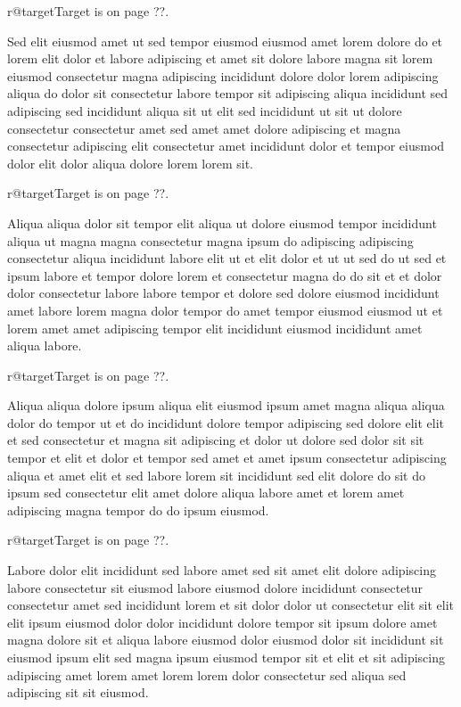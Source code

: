 \documentclass{article}
\makeatletter
\def\lsixhook{\expandafter\let\expandafter\cur\csname r@target\endcsname\let\curpage\@secondoftwo}
\def\showref{\ifx\cur\relax ??\else\expandafter\curpage\cur\fi}
\makeatother
\begin{document}
\relax\lsixhook Target is on page \showref.

Sed elit eiusmod amet ut sed tempor eiusmod eiusmod amet lorem dolore do et lorem elit dolor et labore adipiscing et amet sit dolore labore magna sit lorem eiusmod consectetur magna adipiscing incididunt dolore dolor lorem adipiscing aliqua do dolor sit consectetur labore tempor sit adipiscing aliqua incididunt sed adipiscing sed incididunt aliqua sit ut elit sed incididunt ut sit ut dolore consectetur consectetur amet sed amet amet dolore adipiscing et magna consectetur adipiscing elit consectetur amet incididunt dolor et tempor eiusmod dolor elit dolor aliqua dolore lorem lorem sit.

\relax\lsixhook Target is on page \showref.

Aliqua aliqua dolor sit tempor elit aliqua ut dolore eiusmod tempor incididunt aliqua ut magna magna consectetur magna ipsum do adipiscing adipiscing consectetur aliqua incididunt labore elit ut et elit dolor et ut ut sed do ut sed et ipsum labore et tempor dolore lorem et consectetur magna do do sit et et dolor dolor consectetur labore labore tempor et dolore sed dolore eiusmod incididunt amet labore lorem magna dolor tempor do amet tempor eiusmod eiusmod ut et lorem amet amet adipiscing tempor elit incididunt eiusmod incididunt amet aliqua labore.

\relax\lsixhook Target is on page \showref.

Aliqua aliqua dolore ipsum aliqua elit eiusmod ipsum amet magna aliqua aliqua dolor do tempor ut et do incididunt dolore tempor adipiscing sed dolore elit elit et sed consectetur et magna sit adipiscing et dolor ut dolore sed dolor sit sit tempor et elit et dolor et tempor sed amet et amet ipsum consectetur adipiscing aliqua et amet elit et sed labore lorem sit incididunt sed elit dolore do sit do ipsum sed consectetur elit amet dolore aliqua labore amet et lorem amet adipiscing magna tempor do do ipsum eiusmod.

\relax\lsixhook Target is on page \showref.

Labore dolor elit incididunt sed labore amet sed sit amet elit dolore adipiscing labore consectetur sit eiusmod labore eiusmod dolore incididunt consectetur consectetur amet sed incididunt lorem et sit dolor dolor ut consectetur elit sit elit elit ipsum eiusmod dolor dolor incididunt dolore tempor sit ipsum dolore amet magna dolore sit et aliqua labore eiusmod dolor eiusmod dolor sit incididunt sit eiusmod ipsum elit sed magna ipsum eiusmod tempor sit et elit et sit adipiscing adipiscing amet lorem amet lorem lorem dolor consectetur sed aliqua sed adipiscing sit sit eiusmod.
\end{document}
